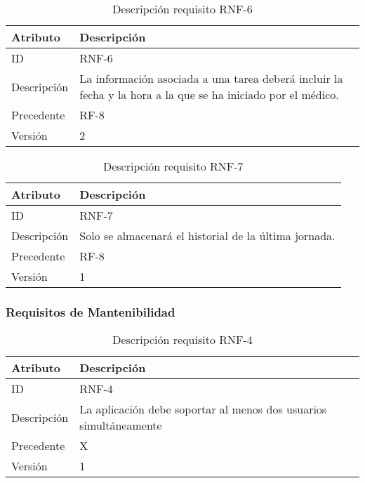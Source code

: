 \begin{table}[H]
    \label{tab:reqNF7}
 	\caption{Descripción requisito RNF-6}
	\centering

	\begin{tabular}{C{3cm}|C{12cm}}
 		\toprule
 		\textbf{Atributo} & \textbf{Descripción} \\
 		\midrule
 	    ID & RNF-6 \\
 	    Descripción & La información asociada a una tarea deberá incluir la fecha y la hora a la que se ha iniciado por el médico. \\
 	    Precedente & RF-8 \\
 	    Versión & 2 \\
 		\bottomrule
 		\end{tabular}
\end{table}

\begin{table}[H]
    \label{tab:reqNF8}
 	\caption{Descripción requisito RNF-7}
	\centering

	\begin{tabular}{C{3cm}|C{12cm}}
 		\toprule
 		\textbf{Atributo} & \textbf{Descripción} \\
 		\midrule
 	    ID & RNF-7 \\
 	    Descripción & Solo se almacenará el historial de la última jornada. \\
 	    Precedente & RF-8 \\
 	    Versión & 1 \\
 		\bottomrule
 		\end{tabular}
\end{table}


\subsubsection{Requisitos de Mantenibilidad}

\begin{table}[H]
    \label{tab:reqNF1}
 	\caption{Descripción requisito RNF-4}
	\centering

	\begin{tabular}{C{3cm}|C{12cm}}
 		\toprule
 		\textbf{Atributo} & \textbf{Descripción} \\
 		\midrule
 	    ID & RNF-4 \\
 	    Descripción & La aplicación debe soportar al menos dos usuarios simultáneamente \\
 	    Precedente & X \\
 	    Versión & 1 \\
 		\bottomrule
 		\end{tabular}
\end{table}

